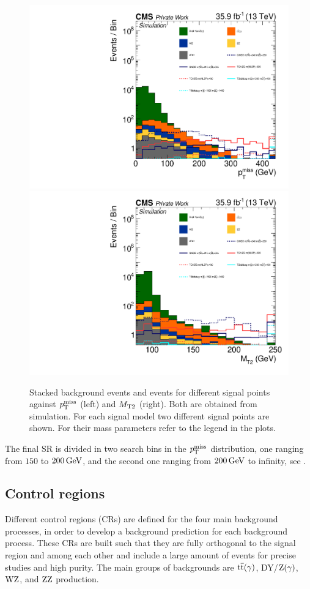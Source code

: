 \begin{figure}[tbp]
 \centering
 \includegraphics[width=\pairwidth]{figures/plots/onZ_LL_met_log}
 \includegraphics[width=\pairwidth]{figures/plots/onZ_LL_mt2_log}
 \caption{Stacked background events and events for different signal points against $p_{\mathrm{T}}^\text{miss}$ (left) and $M_{\mathrm{T2}}$ (right). Both are obtained from simulation. For each signal model two different signal points are shown. For their mass parameters refer to the legend in the plots.}
 \label{fig:SRvariables}
\end{figure}
The final SR is divided in two search bins in the $p_{\mathrm{T}}^\text{miss}$ distribution, one ranging from $150$ to $200\,\text{Ge\hspace{-.08em}V}$, and the second one ranging from $200\,\text{Ge\hspace{-.08em}V}$ to infinity, see .

\subsection{Control regions}\label{sec:CR}
Different control regions (CRs) are defined for the four main background processes, in order to develop a background prediction for each background process. These CRs are built such that they are fully orthogonal to the signal region and among each other and include a large amount of events for precise studies and high purity. The main groups of backgrounds are ${\mathrm{t}\overline{\mathrm{t}}}(\gamma)$, DY/$\mathrm{Z}(\gamma)$, $\mathrm{W}\mathrm{Z}$, and $\mathrm{Z}\mathrm{Z}$ production.

